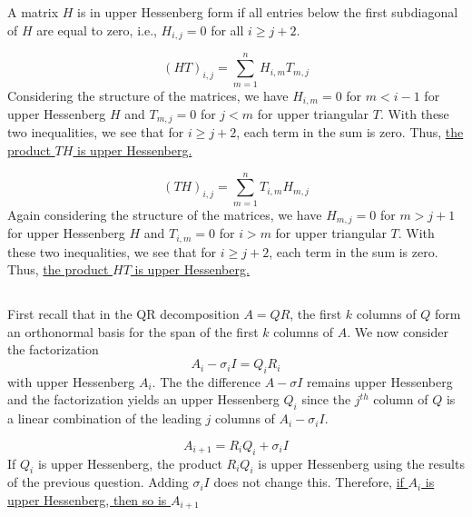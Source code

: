 \documentclass[11pt]{article} %
\begin{document}
\subsection{} %

A matrix $H$ is in upper Hessenberg form if all entries below the first subdiagonal of $H$ are equal to zero, i.e., $H_{i,j} = 0$ for all $i \ge j+2$. 

\begin{equation}
(HT)_{i,j} = \sum_{m=1}^n H_{i,m} T_{m,j}
\end{equation}
Considering the structure of the matrices, we have $H_{i,m} = 0$ for $m < i-1$ for upper Hessenberg $H$ and $T_{m,j}=0$ for $j < m$ for upper triangular $T$. With these two inequalities, we see that for $i \ge j+2$, each term in the sum is zero. Thus, \uline{the product $TH$ is upper Hessenberg.}

\begin{equation}
(TH)_{i,j} = \sum_{m=1}^n T_{i,m} H_{m,j}
\end{equation}
Again considering the structure of the matrices, we have $H_{m,j} = 0$ for $m > j+1$ for upper Hessenberg $H$ and $T_{i,m}=0$ for $i > m$ for upper triangular $T$. With these two inequalities, we see that for $i \ge j+2$, each term in the sum is zero. Thus, \uline{the product $HT$ is upper Hessenberg.}

\subsection{} %
First recall that in the QR decomposition $A=QR$, the first $k$ columns of $Q$ form an orthonormal basis for the span of the first $k$ columns of $A$. We now consider the factorization
\begin{equation}
A_i - \sigma_i I = Q_i R_i
\end{equation}
with upper Hessenberg $A_i$. The the difference $A- \sigma I $ remains upper Hessenberg and the factorization yields an upper Hessenberg $Q_i$ since the $j^{th}$ column of $Q$ is a linear combination of the leading $j$ columns of $A_i - \sigma_i I$.

\begin{equation}
A_{i+1} = R_i Q_i + \sigma_i I
\end{equation}
If $Q_i$ is upper Hessenberg, the product $R_i Q_i$ is upper Hessenberg using the results of the previous question. Adding $\sigma_i I$ does not change this. Therefore, \uline{if $A_i$ is upper Hessenberg, then so is $A_{i+1}$}
\end{document}

